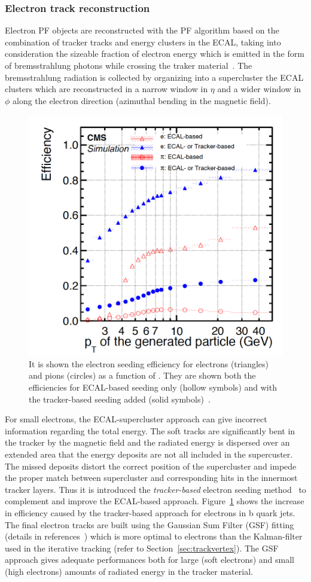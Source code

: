 \subsubsection{Electron track reconstruction}\label{sec:trackele}

Electron PF objects are reconstructed with the PF algorithm 
based on the combination of tracker tracks and energy clusters in the 
ECAL, taking into consideration the sizeable fraction
of electron energy which is emitted in the form of bremsstrahlung photons while
crossing the traker material~\cite{CMS:particleflow}. The bremsstrahlung radiation is collected
by organizing into a supercluster the ECAL clusters which are
reconstructed in a narrow window in $\eta$ and a wider window in $\phi$ along the electron direction (azimuthal
bending in the magnetic field).

 \begin{figure}
\includegraphics[width=.4\textwidth]{Figures/c2/eleecal}
  \caption{It is shown the electron seeding efficiency for electrons (triangles) and pions (circles) as a
function of \pt. They are shown both the efficiencies for ECAL-based
seeding only (hollow symbols) and with the tracker-based seeding added
(solid symbols)~\cite{CMS:particleflow}.}
  \label{fig:c2ele}
\end{figure} 

For small \pt electrons, the ECAL-supercluster approach can give
incorrect information regarding the total energy. The soft tracks are
significantly bent in the tracker by the magnetic field and the
radiated energy is dispersed over an extended area that the energy
deposits are not all
included in the supercuster. The missed deposits distort the correct
position of the supercluster and impede the proper match between
supercluster and corresponding hits in the innermost tracker layers.
Thus it is introduced the \emph{tracker-based} electron seeding
method~\cite{CMS:particleflow} to complement and improve the
ECAL-based approach. Figure~\ref{fig:c2ele} shows the increase in efficiency caused by the tracker-based approach for electrons in b quark jets.\\
The final electron tracks are built using the Gaussian Sum Filter
(GSF) fitting (details in references~\cite{CMS:particleflow, Adam_2005}) which is more optimal to electrons than the Kalman-filter used
in the iterative tracking (refer to
Section~\ref{sec:trackvertex}). The GSF approach gives adequate
performances both for large (\ie soft electrons) and small (\ie high \pt electrons) amounts of radiated energy in the
tracker material.

